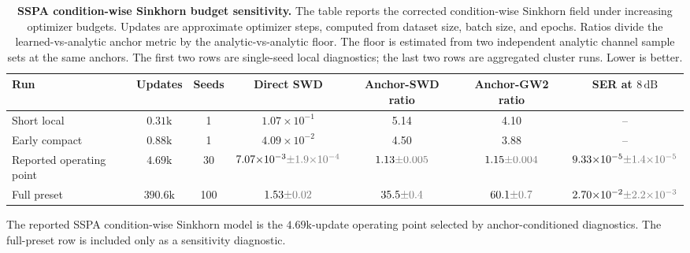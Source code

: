 \begin{table}[t]
\centering
\caption{\textbf{SSPA condition-wise Sinkhorn budget sensitivity.} The table reports the corrected condition-wise Sinkhorn field under increasing optimizer budgets. Updates are approximate optimizer steps, computed from dataset size, batch size, and epochs. Ratios divide the learned-vs-analytic anchor metric by the analytic-vs-analytic floor. The floor is estimated from two independent analytic channel sample sets at the same anchors. The first two rows are single-seed local diagnostics; the last two rows are aggregated cluster runs. Lower is better.}
\label{tab:sspa-budget-sensitivity}
\tablefontsize
\begin{tabular}{@{}lcccccc@{}}
\toprule
Run & Updates & Seeds & Direct SWD & Anchor-SWD ratio & Anchor-GW2 ratio & SER at \(8\,\mathrm{dB}\) \\
\midrule
Short local & \(0.31\mathrm{k}\) & 1 & \(1.07{\times}10^{-1}\) & 5.14 & 4.10 & -- \\
Early compact & \(0.88\mathrm{k}\) & 1 & \(4.09{\times}10^{-2}\) & 4.50 & 3.88 & -- \\
Reported operating point & \(4.69\mathrm{k}\) & 30 & \(7.07{\times}10^{-3}\err{1.9{\times}10^{-4}}\) & \(1.13\err{0.005}\) & \(1.15\err{0.004}\) & \(9.33{\times}10^{-5}\err{1.4{\times}10^{-5}}\) \\
Full preset & \(390.6\mathrm{k}\) & 100 & \(1.53\err{0.02}\) & \(35.5\err{0.4}\) & \(60.1\err{0.7}\) & \(2.70{\times}10^{-2}\err{2.2{\times}10^{-3}}\) \\
\bottomrule
\end{tabular}
\par\vspace{0.25em}
\begin{minipage}{0.94\textwidth}
\footnotesize\raggedright
The reported SSPA condition-wise Sinkhorn model is the \(4.69\mathrm{k}\)-update operating point selected by anchor-conditioned diagnostics. The full-preset row is included only as a sensitivity diagnostic.
\end{minipage}
\end{table}
